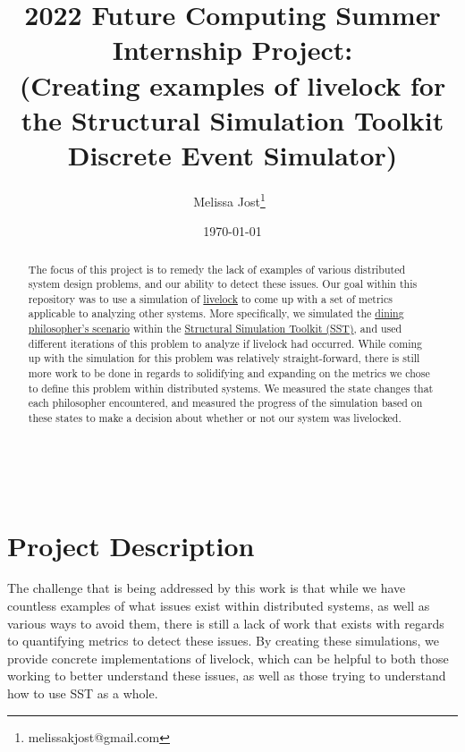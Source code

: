\documentclass{article}
\begin{document}
        \title{2022 Future Computing Summer Internship Project:\\(Creating examples of livelock for the Structural Simulation Toolkit Discrete Event Simulator)}
        \author{Melissa Jost\thanks{melissakjost@gmail.com}\ }
        \date{\today}
            \maketitle
        \begin{abstract}
            The focus of this project is to remedy the lack of examples of various distributed system
            design problems, and our ability to detect these issues.  Our goal within this 
            repository was to use a simulation of \href{https://en.wikipedia.org/wiki/Deadlock#Livelock}{livelock} to come up with a set of metrics applicable to analyzing other systems.  More specifically, we simulated the 
            \href{https://en.wikipedia.org/wiki/Dining_philosophers_problem}{dining philosopher's scenario} within the \href{http://sst-simulator.org/}{Structural Simulation Toolkit (SST)}, and used different iterations of this problem to analyze if livelock had occurred.  
            While coming up with the simulation for this problem was relatively straight-forward, there is still more work 
            to be done in regards to solidifying and expanding on the metrics we chose to define this problem within distributed systems. We measured the state changes that each philosopher encountered, and measured the progress of the simulation based on these states to make a decision about whether or not our system was livelocked.
        \end{abstract}

\ \\


\section{Project Description} %

The challenge that is being addressed by this work is that while we have countless examples of 
what issues exist within distributed systems, as well as various ways to avoid them, there is 
still a lack of work that exists with regards to quantifying metrics to detect these issues.  
By creating these simulations, we provide concrete implementations of livelock, which can be 
helpful to both those working to better understand these issues, as well as those trying to 
understand how to use SST as a whole.
\end{document}
